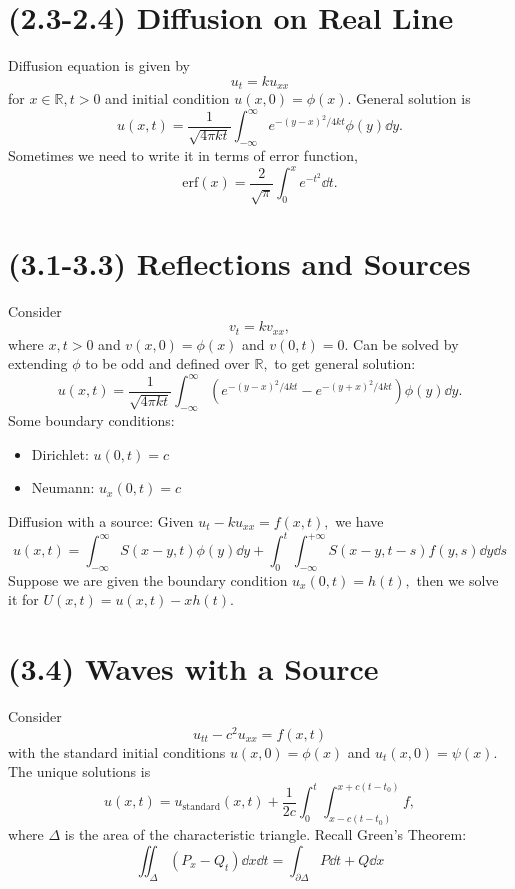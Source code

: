 \documentclass{article}
\numberwithin{equation}{section}
\begin{document}
\section{(2.3-2.4) Diffusion on Real Line}
Diffusion equation is given by 
\begin{equation}
    u_t = ku_{xx}
\end{equation}
for $x\in \mathbb{R}, t>0$ and initial condition $u(x,0)=\phi(x).$ General solution is 
\begin{equation}
    u(x,t) = \frac{1}{\sqrt{4\pi kt}}\int_{-\infty}^{\infty} e^{-(y-x)^2/4kt}\phi(y) \dd{y}.
\end{equation}
Sometimes we need to write it in terms of error function,
\begin{equation}
    \text{erf}(x) = \frac{2}{\sqrt{\pi}}\int_0^x e^{-t^2} \dd{t}.
\end{equation}
\section{(3.1-3.3) Reflections and Sources}
Consider 
\begin{equation}
    v_t = kv_{xx},
\end{equation}
where $x,t>0$ and $v(x,0)=\phi(x)$ and $v(0,t)=0.$ Can be solved by extending $\phi$ to be odd and defined over $\mathbb{R},$ to get general solution:
\begin{equation}
    u(x,t) = \frac{1}{\sqrt{4\pi kt}}\int_{-\infty}^{\infty} \left(e^{-(y-x)^2/4kt} - e^{-(y+x)^2/4kt}\right)\phi(y) \dd{y}.
\end{equation}
Some boundary conditions:
\begin{itemize}
    \item Dirichlet: $u(0,t)=c$
    \item Neumann: $u_x(0,t)=c$ 
\end{itemize}
Diffusion with a source: Given $u_t - ku_{xx} = f(x,t),$ we have 
\begin{equation}
    u(x,t) = \int_{-\infty}^{\infty} S(x-y,t)\phi(y) \dd{y} + \int_0^t \int_{-\infty}^{+\infty} S(x-y,t-s)f(y,s)\dd{y}\dd{s}
\end{equation}
Suppose we are given the boundary condition $u_x(0,t)=h(t),$ then we solve it for $U(x,t)=u(x,t)-xh(t).$
\section{(3.4) Waves with a Source}
Consider 
\begin{equation}
    u_{tt} - c^2u_{xx} =f(x,t)
\end{equation}
with the standard initial conditions $u(x,0)=\phi(x)$ and $u_t(x,0)=\psi(x).$ The unique solutions is
\begin{equation}
    u(x,t) = u_\text{standard}(x,t) + \frac{1}{2c}\int_0^t \int_{x-c(t-t_0)}^{x+c(t-t_0)}f,
\end{equation}
where $\Delta$ is the area of the characteristic triangle. Recall Green's Theorem:
\begin{equation}
    \iint_{\Delta} (P_x - Q_t)\dd{x}\dd{t} = \int_{\partial \Delta} P \dd{t} + Q\dd{x}
\end{equation}
\end{document}
